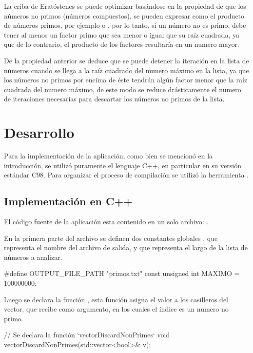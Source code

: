 \documentclass[12pt]{article}
\newenvironment{fullgrayverb}
{\verbbox}
{\endverbbox\par\colorbox{gray!25}{\parbox{\textwidth}{\theverbbox}}\par}
\def\fileName{primos.cpp}
\begin{document}
La criba de Eratóstenes se puede optimizar basándose en la propiedad de que los
números no primos (números compuestos), se pueden expresar como el producto de
números primos, por ejemplo  o , por lo tanto, si
un número no es primo, debe tener al menos un factor primo que sea menor o igual
que su raíz cuadrada, ya que de lo contrario, el producto de los factores
resultaría en un numero mayor.

De la propiedad anterior se deduce que se puede detener la iteración en la lista
de números cuando se llega a la raíz cuadrado del numero máximo en la lista, ya
que los números no primos por encima de éste tendrán algún factor menor que la
raíz cuadrada del numero máximo, de este modo se reduce drásticamente el numero
de iteraciones necesarias para descartar los números no primos de la lista.

\section{Desarrollo}

Para la implementación de la aplicación, como bien se mencionó en la
introducción, se utilizó puramente el lenguaje C++, en particular en su versión
estándar C98. Para organizar el proceso de compilación se utilizó la herramienta
.

\subsection{Implementación en C++}

El código fuente de la aplicación esta contenido en un solo archivo:
\code{\fileName}.

En la primera parte del archivo se definen dos constantes globales
, que representa el nombre del archivo de salida, y
 que representa el largo de la lista de números a analizar.

\begin{fullgrayverb}[\mbox{}]
#define OUTPUT_FILE_PATH "primos.txt"
const unsigned int MAXIMO = 100000000;
\end{fullgrayverb}

Luego se declara la función , esta función asigna
el valor  a los casilleros del vector, que recibe como argumento, en
los cuales el índice es un numero no primo.

\begin{fullgrayverb}[\mbox{}]
// Se declara la función `vectorDiscardNonPrimes`
void vectorDiscardNonPrimes(std::vector<bool>& v);
\end{fullgrayverb}
\end{document}
